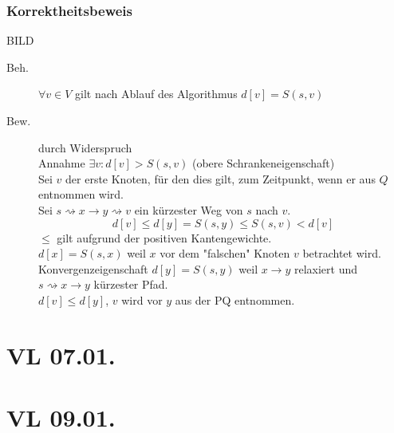 \documentclass[a4paper,draft,twoside,10pt]{report}
\begin{document}
\subsection{Korrektheitsbeweis}
BILD\\
\begin{description}
\item[Beh.]$\forall v \in V$ gilt nach Ablauf des Algorithmus $d[v]= S(s,v)$
\item[Bew.] durch Widerspruch\\
Annahme $\exists v:d[v]> S(s,v)$ (obere Schrankeneigenschaft)\\
Sei $v$ der erste Knoten, für den dies gilt, zum Zeitpunkt, wenn er aus $Q$ entnommen wird.\\
Sei $s \rightsquigarrow x\rightarrow y \rightsquigarrow v$ ein kürzester Weg von $s$ nach $v$.
\[d[v]\le d[y]=S(s,y)\le S(s,v)<d[v]\]
$\le $ gilt aufgrund der positiven Kantengewichte.\\[.5em]
$d[x]=S(s,x)$ weil $x$ vor dem "falschen" Knoten $v$ betrachtet wird.\\[.5em]
Konvergenzeigenschaft $d[y]=S(s,y)$ weil $x\rightarrow y$ relaxiert und $s \rightsquigarrow x\rightarrow y $ kürzester Pfad.\\[.5em]
$d[v]\le d[y]$, $v$ wird vor $y$ aus der PQ entnommen.
\end{description}


\chapter{VL 07.01.}
\chapter{VL 09.01.}
\end{document}
